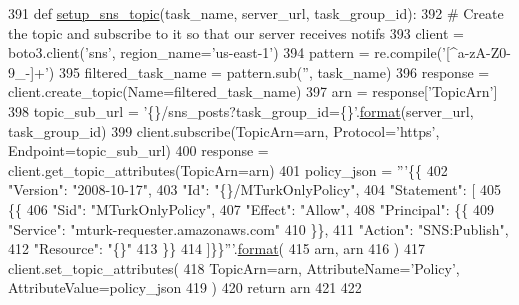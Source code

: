\begin{DoxyCode}
391 \textcolor{keyword}{def }\hyperlink{namespaceparlai_1_1mturk_1_1core_1_1mturk__utils_a98c01409407393818d100c21a4e07742}{setup\_sns\_topic}(task\_name, server\_url, task\_group\_id):
392     \textcolor{comment}{# Create the topic and subscribe to it so that our server receives notifs}
393     client = boto3.client(\textcolor{stringliteral}{'sns'}, region\_name=\textcolor{stringliteral}{'us-east-1'})
394     pattern = re.compile(\textcolor{stringliteral}{'[^a-zA-Z0-9\_-]+'})
395     filtered\_task\_name = pattern.sub(\textcolor{stringliteral}{''}, task\_name)
396     response = client.create\_topic(Name=filtered\_task\_name)
397     arn = response[\textcolor{stringliteral}{'TopicArn'}]
398     topic\_sub\_url = \textcolor{stringliteral}{'\{\}/sns\_posts?task\_group\_id=\{\}'}.\hyperlink{namespaceparlai_1_1chat__service_1_1services_1_1messenger_1_1shared__utils_a32e2e2022b824fbaf80c747160b52a76}{format}(server\_url, task\_group\_id)
399     client.subscribe(TopicArn=arn, Protocol=\textcolor{stringliteral}{'https'}, Endpoint=topic\_sub\_url)
400     response = client.get\_topic\_attributes(TopicArn=arn)
401     policy\_json = \textcolor{stringliteral}{'''\{\{}
402 \textcolor{stringliteral}{    "Version": "2008-10-17",}
403 \textcolor{stringliteral}{    "Id": "\{\}/MTurkOnlyPolicy",}
404 \textcolor{stringliteral}{    "Statement": [}
405 \textcolor{stringliteral}{        \{\{}
406 \textcolor{stringliteral}{            "Sid": "MTurkOnlyPolicy",}
407 \textcolor{stringliteral}{            "Effect": "Allow",}
408 \textcolor{stringliteral}{            "Principal": \{\{}
409 \textcolor{stringliteral}{                "Service": "mturk-requester.amazonaws.com"}
410 \textcolor{stringliteral}{            \}\},}
411 \textcolor{stringliteral}{            "Action": "SNS:Publish",}
412 \textcolor{stringliteral}{            "Resource": "\{\}"}
413 \textcolor{stringliteral}{        \}\}}
414 \textcolor{stringliteral}{    ]\}\}'''}.\hyperlink{namespaceparlai_1_1chat__service_1_1services_1_1messenger_1_1shared__utils_a32e2e2022b824fbaf80c747160b52a76}{format}(
415         arn, arn
416     )
417     client.set\_topic\_attributes(
418         TopicArn=arn, AttributeName=\textcolor{stringliteral}{'Policy'}, AttributeValue=policy\_json
419     )
420     \textcolor{keywordflow}{return} arn
421 
422 
\end{DoxyCode}
\mbox{\label{namespaceparlai_1_1mturk_1_1core_1_1legacy__2018_1_1mturk__utils_a157c3612c4df1187d8b8b5cfccbd339c}} 

